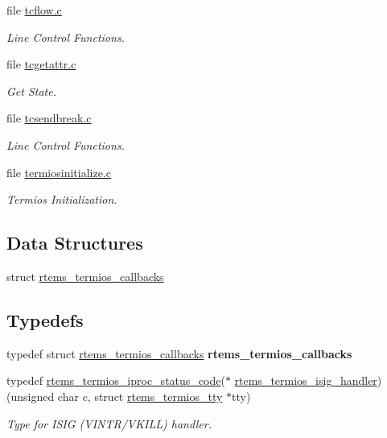 \begin{DoxyCompactItemize}
file \mbox{\hyperlink{tcflow_8c}{tcflow.\+c}}
\begin{DoxyCompactList}\small\item\em Line Control Functions. \end{DoxyCompactList}\item 
file \mbox{\hyperlink{tcgetattr_8c}{tcgetattr.\+c}}
\begin{DoxyCompactList}\small\item\em Get State. \end{DoxyCompactList}\item 
file \mbox{\hyperlink{tcsendbreak_8c}{tcsendbreak.\+c}}
\begin{DoxyCompactList}\small\item\em Line Control Functions. \end{DoxyCompactList}\item 
file \mbox{\hyperlink{termiosinitialize_8c}{termiosinitialize.\+c}}
\begin{DoxyCompactList}\small\item\em Termios Initialization. \end{DoxyCompactList}\end{DoxyCompactItemize}
\subsection*{Data Structures}
\begin{DoxyCompactItemize}
\item 
struct \mbox{\hyperlink{structrtems__termios__callbacks}{rtems\+\_\+termios\+\_\+callbacks}}
\end{DoxyCompactItemize}
\subsection*{Typedefs}
\begin{DoxyCompactItemize}
\item 
\mbox{\label{group__Termios_ga6ef021a9fe94e8e9a4835ca4a5e645ef}} 
typedef struct \mbox{\hyperlink{structrtems__termios__callbacks}{rtems\+\_\+termios\+\_\+callbacks}} {\bfseries rtems\+\_\+termios\+\_\+callbacks}
\item 
typedef \mbox{\hyperlink{group__Termios_ga8d00143bb99772a960e237f16437fc1b}{rtems\+\_\+termios\+\_\+iproc\+\_\+status\+\_\+code}}($\ast$ \mbox{\hyperlink{group__Termios_ga8a2610b7c8bcc2c80bbd040f0e773faf}{rtems\+\_\+termios\+\_\+isig\+\_\+handler}}) (unsigned char c, struct \mbox{\hyperlink{structrtems__termios__tty}{rtems\+\_\+termios\+\_\+tty}} $\ast$tty)
\begin{DoxyCompactList}\small\item\em Type for I\+S\+IG (V\+I\+N\+T\+R/\+V\+K\+I\+LL) handler. \end{DoxyCompactList}\end{DoxyCompactItemize}
